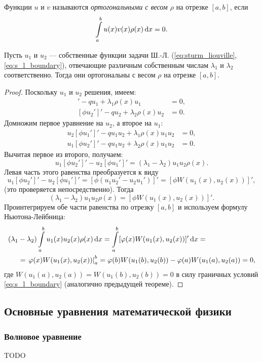 \begin{definition}
    Функции $u$ и $v$ называются \emph{ортогональными с весом $\rho$} на отрезке $[a, b]$, если
    \[ \int\limits_{a}^{b} u(x) v(x) \rho(x) \,\mathrm{d}{x} = 0. \]
\end{definition}

\begin{theorem}
    Пусть $u_1$ и $u_2$ --- собственные функции задачи Ш.-Л. (\ref{eq:sturm_liouville}, \ref{eq:s_l_boundary}), отвечающие различным собственным числам $\lambda_1$ и $\lambda_2$ соответственно. Тогда они ортогональны с весом $\rho$ на отрезке $[a, b]$.
\end{theorem}

\begin{proof}
    Поскольку $u_1$ и $u_2$ решения, имеем:
    \begin{align*}
        [\phi u_1']' - q u_1 + \lambda_1 \rho(x) u_1 &= 0, \\
        [\phi u_2']' - q u_2 + \lambda_2 \rho(x) u_2 &= 0.
    \end{align*}
    Домножим первое уравнение на $u_2$, а второе на $u_1$:
    \begin{align*}
        u_2 [\phi u_1']' - q u_1 u_2 + \lambda_1 \rho(x) u_1 u_2 &= 0, \\
        u_1 [\phi u_2']' - q u_1 u_2 + \lambda_2 \rho(x) u_1 u_2 &= 0.
    \end{align*}
    Вычитая первое из второго, получаем:
    \[ u_1 [\phi u_2']' - u_2 [\phi u_1']' = (\lambda_1 - \lambda_2) u_1 u_2 \rho(x). \]
    Левая часть этого равенства преобразуется к виду
    \[ u_1 [\phi u_2']' - u_2 [\phi u_1']' = [\phi (u_1 u_2' - u_2 u_1')]' = [\phi W(u_1(x), u_2(x))]', \]
    (это проверяется непосредственно). Тогда
    \[ (\lambda_1 - \lambda_2) u_1 u_2 \rho(x) = [\phi W(u_1(x), u_2(x))]'. \]
    Проинтегрируем обе части равенства по отрезку $[a, b]$ и используем формулу Ньютона-Лейбница:
    \begin{align*}
        (\lambda_1 &- \lambda_2) \int\limits_{a}^{b} u_1(x) u_2(x) \rho(x) \,\mathrm{d}{x} =
        \int\limits_{a}^{b} [\varphi(x) W(u_1(x), u_2(x))]' \,\mathrm{d}{x} = \\ &=
        \left. \varphi(x) W(u_1(x), u_2(x)) \right|_{a}^{b} = \varphi(b) W(u_1(b), u_2(b)) -
        \varphi(a) W(u_1(a), u_2(a)) = 0,
    \end{align*}
    где $W(u_1(a), u_2(a)) = W(u_1(b), u_2(b)) = 0$ в силу граничных условий \eqref{eq:s_l_boundary} (аналогично предыдущей теореме).
\end{proof}

\subsection{Основные уравнения математической физики}
\subsubsection{Волновое уравнение}
TODO
